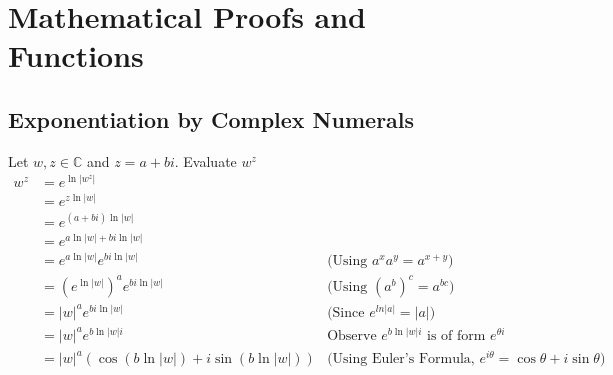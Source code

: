 \documentclass[11pt,a4paper]{book}
\begin{document}
\chapter{Mathematical Proofs and Functions}
\section{Exponentiation by Complex Numerals}
Let $w, z \in \mathbb{C}$ and $z = a + bi$. Evaluate $w^z$
\begin{align*}
w^z & = e^{\ln|w^z|} & \\
& = e^{z\ln|w|} & \\
& = e^{(a + bi)\ln|w|} & \\
& = e^{a\ln|w| + bi\ln|w|} & \\
& = e^{a\ln|w|}e^{bi\ln|w|} & \text{(Using $a^xa^y = a^{x+y}$)}\\
& = \left(e^{\ln|w|}\right)^a e^{bi\ln|w|}  & \text{(Using $\left(a^{b}\right)^c = a^{bc}$)}\\
& = |w|^ae^{bi\ln|w|} & \text{(Since $e^{ln|a|} = |a|$)} \\
& = |w|^ae^{b\ln|w|i} & \text{Observe $e^{b\ln|w|i}$ is of form $e^{\theta i}$}\\
& = |w|^a\left(\cos\left(b\ln|w|\right) + i \sin\left(b\ln|w|\right) \right) & \text{(Using Euler's Formula, $e^{i\theta} = \cos\theta + i\sin\theta$)}
\end{align*}





\end{document}
